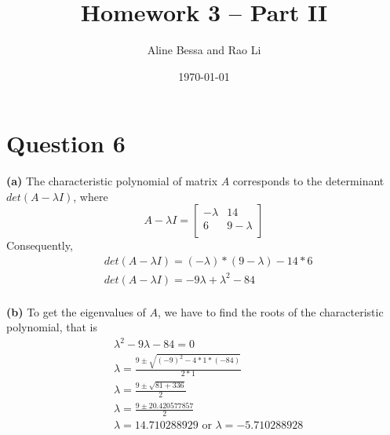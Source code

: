 \documentclass[leqno]{article}
\title{Homework 3 -- Part II}
\author{Aline Bessa and Rao Li}
\date\today
\begin{document}
\maketitle %

\section*{Question 6} \textbf{(a)} The characteristic polynomial of matrix $A$ corresponds to the
determinant $det(A - \lambda I)$, where
\[
A - \lambda I=
  \begin{bmatrix}
  -\lambda & 14 \\
  6 & 9 -\lambda\\ 
  \end{bmatrix}
\]
Consequently,
\begin{equation*}
\begin{split}
&det(A - \lambda I) = (-\lambda)*(9 - \lambda) - 14*6\\
&det(A - \lambda I) = -9\lambda + \lambda^2 - 84\\  
\end{split}
\end{equation*} 

\noindent \textbf{(b)} To get the eigenvalues of $A$, we have to find the roots of the characteristic polynomial,
that is
\begin{equation*}
\begin{split}
&\lambda^2 -9\lambda - 84 = 0\\
&\lambda = \frac{9 \pm \sqrt{(-9)^2 - 4*1*(-84)}}{2*1}\\
&\lambda = \frac{9 \pm \sqrt{81 + 336}}{2}\\
&\lambda = \frac{9 \pm 20.420577857}{2}\\
&\lambda = 14.710288929\mbox{ or }\lambda = -5.710288928  
\end{split}
\end{equation*} 
\end{document}
